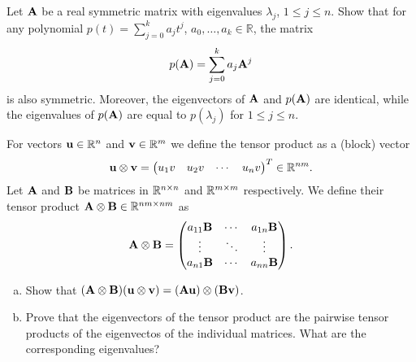 
\begin{Sheet}
  \label{sheet7}

  \begin{Problem}
    Let $\mathbf A$ be a real symmetric matrix with eigenvalues
    $\lambda_j$, $1\leq j\leq n$. Show that for any polynomial
    $p(t) = \sum_{j=0}^k a_jt^j$, $a_0,\ldots, a_k \in \mathbb{R}$,
    the matrix
    \begin{gather*}
      p(\mathbf A) = \sum_{j=0}^k a_j\mathbf A^j
    \end{gather*}
    is also symmetric. Moreover, the eigenvectors of $\mathbf A$ and
    $p(\mathbf A)$ are identical, while the eigenvalues of $p(\mathbf A)$ are
    equal to $p(\lambda_j)$ for $1\leq j\leq n$.
  \end{Problem}

  \begin{Problem}
     \label{sheet7:problem2}

    For vectors $\mathbf u\in\mathbb R^n$ and $\mathbf v\in\mathbb R^m$ we define the tensor
    product as a (block) vector
    \begin{gather*}
      \mathbf u\otimes\mathbf v =
      \begin{pmatrix}
        u_1v& u_2v& \cdots & u_nv
      \end{pmatrix}^T \in\mathbb R^{nm}.
    \end{gather*}
    Let $\mathbf A$ and $\mathbf B$ be matrices in $\mathbb R^{n\times n}$ and
    $\mathbb R^{m\times m}$ respectively. We define their tensor product
    $\mathbf A\otimes\mathbf B\in\mathbb R^{nm\times nm}$ as
    \begin{gather*}
      \mathbf A\otimes\mathbf B =
      \begin{pmatrix}
        a_{11}\mathbf B & \cdots & a_{1n}\mathbf B \\
        \vdots & \ddots & \vdots \\
        a_{n1}\mathbf B & \cdots & a_{nn}\mathbf B
      \end{pmatrix}.
    \end{gather*}
    \begin{enumerate}[(a)]
    \item Show that
      $(\mathbf A\otimes\mathbf B)(\mathbf u\otimes\mathbf v) =
      (\mathbf A\mathbf u)\otimes(\mathbf B\mathbf v)$.
    \item Prove that the eigenvectors of the tensor product are the
      pairwise tensor products of the eigenvectos of the individual
      matrices. What are the corresponding eigenvalues?
    \end{enumerate}
  \end{Problem}


\end{Sheet}
